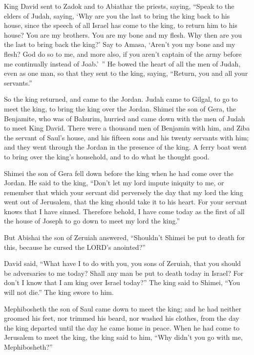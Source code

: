 \myverse{}King David sent to Zadok and to Abiathar the priests, saying,
“Speak to the elders of Judah, saying, ‘Why are you the last to bring the king back to his house, since
the speech of all Israel has come to the king, to return him to his house?
\myverse{}You are my brothers. You are my bone and my flesh. Why then are you the last
to bring back the king?’
\myverse{}Say to Amasa, ‘Aren’t you my bone and my flesh? God do so to me, and more
also, if you aren’t captain of the army before me continually instead of Joab.’ ”
\myverse{}He bowed the heart of all the men of Judah, even as one man, so that they
sent to the king, saying, “Return, you and all your servants.”

\myverse{}So the king returned, and came to the Jordan. Judah came to
Gilgal, to go to meet the king, to bring the king over the Jordan.
\myverse{}Shimei the son of Gera, the Benjamite, who was of Bahurim, hurried and came
down with the men of Judah to meet King David.
\myverse{}There were a thousand men of Benjamin with him, and Ziba the servant of Saul’s
house, and his fifteen sons and his twenty servants with him; and they went through the Jordan in the
presence of the king.
\myverse{}A ferry boat went to bring over the king’s household, and to do what he thought
good.

Shimei the son of Gera fell down before the king when he had come over the Jordan.
\myverse{}He said to the king, “Don’t let my lord impute iniquity to me, or remember
that which your servant did perversely the day that my lord the king went out of Jerusalem, that the king
should take it to his heart.
\myverse{}For your servant knows that I have sinned. Therefore behold, I have come
today as the first of all the house of Joseph to go down to meet my lord the king.”

\myverse{}But Abishai the son of Zeruiah answered, “Shouldn’t Shimei be
put to death for this, because he cursed the LORD’s anointed?”

\myverse{}David said, “What have I to do with you, you sons of Zeruiah,
that you should be adversaries to me today? Shall any man be put to death today in Israel? For don’t I
know that I am king over Israel today?”
\myverse{}The king said to Shimei, “You will not die.” The king swore to him.

\myverse{}Mephibosheth the son of Saul came down to meet the king; and
he had neither groomed his feet, nor trimmed his beard, nor washed his clothes, from the day the king
departed until the day he came home in peace.
\myverse{}When he had come to Jerusalem to meet the king, the king said to him, “Why
didn’t you go with me, Mephibosheth?”


